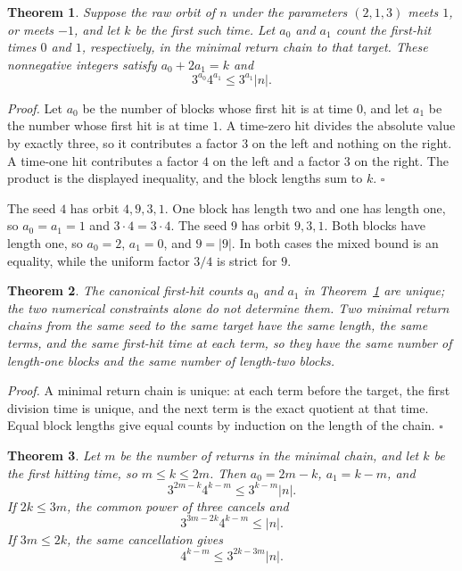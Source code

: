 \documentclass[11pt,letterpaper]{article}
\newtheorem{theorem}{Theorem}
\newenvironment{proof}{\noindent\textit{Proof.}}{\hfill\(\square\)}
\begin{document}
\begin{theorem}
\label{thm:mixed}
Suppose the raw orbit of \(n\) under the parameters \((2,1,3)\) meets \(1\), or meets \(-1\), and let \(k\) be the first such time. Let \(a_0\) and \(a_1\) count the first-hit times \(0\) and \(1\), respectively, in the minimal return chain to that target. These nonnegative integers satisfy \(a_0+2a_1=k\) and
\[
3^{a_{0}}4^{a_{1}}\le 3^{a_{1}}|n|.
\]
\end{theorem}

\begin{proof}
Let \(a_{0}\) be the number of blocks whose first hit is at time \(0\), and let \(a_{1}\) be the number whose first hit is at time \(1\). A time-zero hit divides the absolute value by exactly three, so it contributes a factor \(3\) on the left and nothing on the right. A time-one hit contributes a factor \(4\) on the left and a factor \(3\) on the right. The product is the displayed inequality, and the block lengths sum to \(k\).
\end{proof}

The seed \(4\) has orbit \(4,9,3,1\). One block has length two and one has length one, so \(a_{0}=a_{1}=1\) and \(3\cdot 4=3\cdot 4\). The seed \(9\) has orbit \(9,3,1\). Both blocks have length one, so \(a_{0}=2\), \(a_{1}=0\), and \(9=|9|\). In both cases the mixed bound is an equality, while the uniform factor \(3/4\) is strict for \(9\).

\begin{theorem}
\label{thm:mixedunique}
The canonical first-hit counts \(a_{0}\) and \(a_{1}\) in Theorem~\ref{thm:mixed} are unique; the two numerical constraints alone do not determine them. Two minimal return chains from the same seed to the same target have the same length, the same terms, and the same first-hit time at each term, so they have the same number of length-one blocks and the same number of length-two blocks.
\end{theorem}

\begin{proof}
A minimal return chain is unique: at each term before the target, the first division time is unique, and the next term is the exact quotient at that time. Equal block lengths give equal counts by induction on the length of the chain.
\end{proof}

\begin{theorem}
\label{thm:cleared}
Let \(m\) be the number of returns in the minimal chain, and let \(k\) be the first hitting time, so \(m\le k\le 2m\). Then \(a_{0}=2m-k\), \(a_{1}=k-m\), and
\[
3^{2m-k}4^{k-m}\le 3^{k-m}|n|.
\]
If \(2k\le 3m\), the common power of three cancels and
\[
3^{3m-2k}4^{k-m}\le |n|.
\]
If \(3m\le 2k\), the same cancellation gives
\[
4^{k-m}\le 3^{2k-3m}|n|.
\]
\end{theorem}
\end{document}
